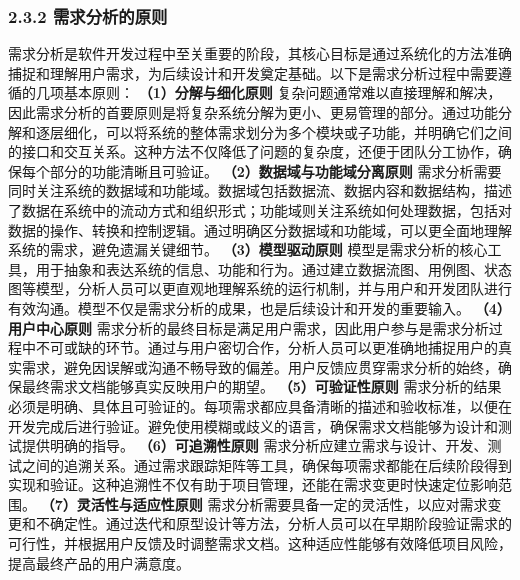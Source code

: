 \subsubsection{2.3.2 需求分析的原则}\label{ux9700ux6c42ux5206ux6790ux7684ux539fux5219}
需求分析是软件开发过程中至关重要的阶段，其核心目标是通过系统化的方法准确捕捉和理解用户需求，为后续设计和开发奠定基础。以下是需求分析过程中需要遵循的几项基本原则： \textbf{（1）分解与细化原则}
复杂问题通常难以直接理解和解决，因此需求分析的首要原则是将复杂系统分解为更小、更易管理的部分。通过功能分解和逐层细化，可以将系统的整体需求划分为多个模块或子功能，并明确它们之间的接口和交互关系。这种方法不仅降低了问题的复杂度，还便于团队分工协作，确保每个部分的功能清晰且可验证。
\textbf{（2）数据域与功能域分离原则}
需求分析需要同时关注系统的数据域和功能域。数据域包括数据流、数据内容和数据结构，描述了数据在系统中的流动方式和组织形式；功能域则关注系统如何处理数据，包括对数据的操作、转换和控制逻辑。通过明确区分数据域和功能域，可以更全面地理解系统的需求，避免遗漏关键细节。
\textbf{（3）模型驱动原则}
模型是需求分析的核心工具，用于抽象和表达系统的信息、功能和行为。通过建立数据流图、用例图、状态图等模型，分析人员可以更直观地理解系统的运行机制，并与用户和开发团队进行有效沟通。模型不仅是需求分析的成果，也是后续设计和开发的重要输入。
\textbf{（4）用户中心原则}
需求分析的最终目标是满足用户需求，因此用户参与是需求分析过程中不可或缺的环节。通过与用户密切合作，分析人员可以更准确地捕捉用户的真实需求，避免因误解或沟通不畅导致的偏差。用户反馈应贯穿需求分析的始终，确保最终需求文档能够真实反映用户的期望。
\textbf{（5）可验证性原则} 需求分析的结果必须是明确、具体且可验证的。每项需求都应具备清晰的描述和验收标准，以便在开发完成后进行验证。避免使用模糊或歧义的语言，确保需求文档能够为设计和测试提供明确的指导。
\textbf{（6）可追溯性原则} 需求分析应建立需求与设计、开发、测试之间的追溯关系。通过需求跟踪矩阵等工具，确保每项需求都能在后续阶段得到实现和验证。这种追溯性不仅有助于项目管理，还能在需求变更时快速定位影响范围。
\textbf{（7）灵活性与适应性原则}
需求分析需要具备一定的灵活性，以应对需求变更和不确定性。通过迭代和原型设计等方法，分析人员可以在早期阶段验证需求的可行性，并根据用户反馈及时调整需求文档。这种适应性能够有效降低项目风险，提高最终产品的用户满意度。
